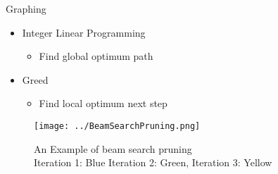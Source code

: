 \documentclass{beamer}
\begin{document}
\begin{tframe}{Graphing}
  \begin{itemize}
  \item Integer Linear Programming
    \begin{itemize}
    \item Find global optimum path
      \end{itemize}
  \item Greed
    \begin{itemize}
    \item Find local optimum next step
      \end{itemize}
  \end{itemize}
  \centering
  
\begin{figure}[H]
  \centering
  \texttt{[image: ../BeamSearchPruning.png]}
  \caption{An Example of beam search pruning\\ Iteration 1: Blue Iteration 2: Green, Iteration 3: Yellow}
  \label{fig:beam-prune}
\end{figure}
\end{tframe}
\end{document}
